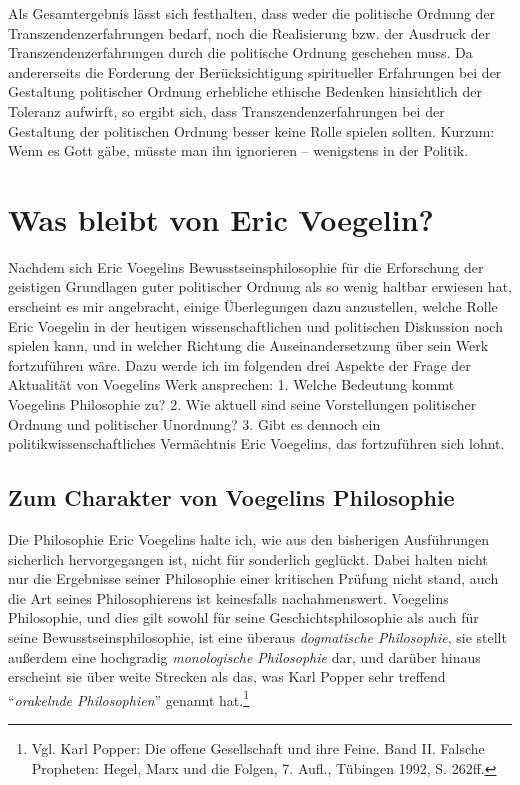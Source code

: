 Als Gesamtergebnis lässt sich festhalten, dass weder die politische Ordnung
der Transzendenzerfahrungen bedarf, noch die Realisierung bzw.  der Ausdruck
der Transzendenzerfahrungen durch die politische Ordnung geschehen muss. Da
andererseits die Forderung der Berücksichtigung spiritueller Erfahrungen bei
der Gestaltung politischer Ordnung erhebliche ethische Bedenken hinsichtlich
der Toleranz aufwirft, so ergibt sich, dass Transzendenzerfahrungen bei der
Gestaltung der politischen Ordnung besser keine Rolle spielen sollten. Kurzum:
Wenn es Gott gäbe, müsste man ihn ignorieren -- wenigstens in der Politik.

\chapter{Was bleibt von Eric Voegelin?}
\label{WasBleibt}

Nachdem sich Eric Voegelins Bewusstseinsphilosophie für die Erforschung der
geistigen Grundlagen guter politischer Ordnung als so wenig haltbar erwiesen
hat, erscheint es mir angebracht, einige Überlegungen dazu anzustellen, welche
Rolle Eric Voegelin in der heutigen wissenschaftlichen und politischen
Diskussion noch spielen kann, und in welcher Richtung die Auseinandersetzung
über sein Werk fortzuführen wäre. Dazu werde ich im folgenden drei Aspekte der
Frage der Aktualität von Voegelins Werk ansprechen: 1. Welche Bedeutung kommt
Voegelins Philosophie zu? 2. Wie aktuell sind seine Vorstellungen politischer
Ordnung und politischer Unordnung? 3. Gibt es dennoch ein
politikwissenschaftliches Vermächtnis Eric Voegelins, das fortzuführen sich
lohnt.

\section{Zum Charakter von Voegelins Philosophie}

Die Philosophie Eric Voegelins halte ich, wie aus den bisherigen Ausführungen
sicherlich hervorgegangen ist, nicht für sonderlich geglückt. Dabei halten
nicht nur die Ergebnisse seiner Philosophie einer kritischen Prüfung nicht
stand, auch die Art seines Philosophierens ist keinesfalls nachahmenswert.
Voegelins Philosophie, und dies gilt sowohl für seine Geschichtsphilosophie
als auch für seine Bewusstseinsphilosophie, ist eine überaus {\em dogmatische
  Philosophie}, sie stellt außerdem eine hochgradig {\em monologische
  Philosophie} dar, und darüber hinaus erscheint sie über weite Strecken als
das, was Karl Popper sehr treffend "`{\em orakelnde Philosophien}"' genannt
hat.\footnote{Vgl. Karl Popper: Die offene Gesellschaft und ihre Feine.  Band
  II. Falsche Propheten: Hegel, Marx und die Folgen, 7. Aufl., Tübingen 1992,
  S. 262ff.}

